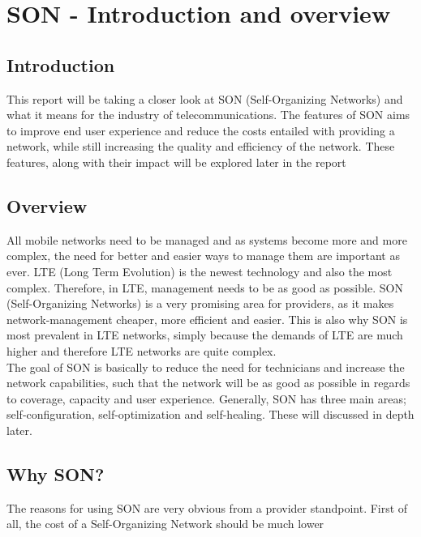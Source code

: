\documentclass{report}
\begin{document}
\newpage
\tableofcontents
\newpage


\chapter{SON - Introduction and overview}
\section{Introduction}
This report will be taking a closer look at SON (Self-Organizing Networks) and what it means for the industry of telecommunications. 
The features of SON aims to improve end user experience and reduce the costs entailed with providing a network, while still increasing the quality and efficiency of the network. 
These features, along with their impact will be explored later in the report 

\section{Overview}
All mobile networks need to be managed and as systems become more and more complex, the need for better and easier ways to manage them are important as ever. LTE (Long Term Evolution) is the newest technology and also the most complex. Therefore, in LTE, management needs to be as good as possible. SON (Self-Organizing Networks) is a very promising area for providers, as it makes network-management cheaper, more efficient and easier. This is also why SON is most prevalent in LTE networks, simply because the demands of LTE are much higher and therefore LTE networks are quite complex.\\ The goal of SON is basically to reduce the need for technicians and increase the network capabilities, such that the network will be as good as possible in regards to coverage, capacity and user experience. Generally, SON has three main areas; self-configuration, self-optimization and self-healing. These will discussed in depth later. 

\section{Why SON?}
The reasons for using SON are very obvious from a provider standpoint. First of all, the cost of a Self-Organizing Network should be much lower 
\end{document}
